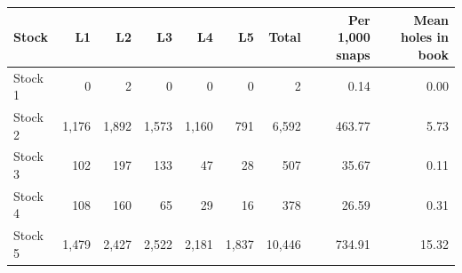 \begin{tabular}{lrrrrrrrr}
\toprule
Stock & L1 & L2 & L3 & L4 & L5 & Total & Per 1,000 snaps & Mean holes in book \\
\midrule
Stock 1 & 0 & 2 & 0 & 0 & 0 & 2 & 0.14 & 0.00 \\
Stock 2 & 1{,}176 & 1{,}892 & 1{,}573 & 1{,}160 & 791 & 6{,}592 & 463.77 & 5.73 \\
Stock 3 & 102 & 197 & 133 & 47 & 28 & 507 & 35.67 & 0.11 \\
Stock 4 & 108 & 160 & 65 & 29 & 16 & 378 & 26.59 & 0.31 \\
Stock 5 & 1{,}479 & 2{,}427 & 2{,}522 & 2{,}181 & 1{,}837 & 10{,}446 & 734.91 & 15.32 \\
\bottomrule
\end{tabular}
